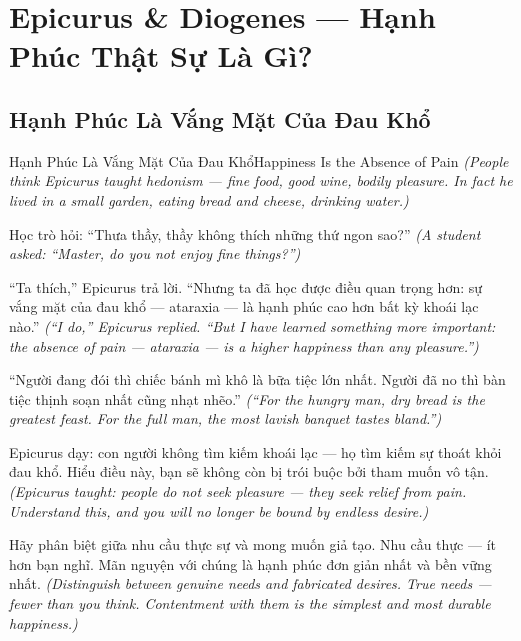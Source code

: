 \chapter{Epicurus \& Diogenes — Hạnh Phúc Thật Sự Là Gì?}

\section{Hạnh Phúc Là Vắng Mặt Của Đau Khổ}
\begin{truyen}{Hạnh Phúc Là Vắng Mặt Của Đau Khổ}{Happiness Is the Absence of Pain}
\textit{(People think Epicurus taught hedonism — fine food, good wine, bodily pleasure. In fact he lived in a small garden, eating bread and cheese, drinking water.)}

Học trò hỏi: ``Thưa thầy, thầy không thích những thứ ngon sao?''
\textit{(A student asked: ``Master, do you not enjoy fine things?'')}

``Ta thích,'' Epicurus trả lời. ``Nhưng ta đã học được điều quan trọng hơn: sự vắng mặt của đau khổ — ataraxia — là hạnh phúc cao hơn bất kỳ khoái lạc nào.''
\textit{(``I do,'' Epicurus replied. ``But I have learned something more important: the absence of pain — ataraxia — is a higher happiness than any pleasure.'')}

``Người đang đói thì chiếc bánh mì khô là bữa tiệc lớn nhất. Người đã no thì bàn tiệc thịnh soạn nhất cũng nhạt nhẽo.''
\textit{(``For the hungry man, dry bread is the greatest feast. For the full man, the most lavish banquet tastes bland.'')}

Epicurus dạy: con người không tìm kiếm khoái lạc — họ tìm kiếm sự thoát khỏi đau khổ. Hiểu điều này, bạn sẽ không còn bị trói buộc bởi tham muốn vô tận.
\textit{(Epicurus taught: people do not seek pleasure — they seek relief from pain. Understand this, and you will no longer be bound by endless desire.)}

\end{truyen}

\begin{baihoc}
Hãy phân biệt giữa nhu cầu thực sự và mong muốn giả tạo. Nhu cầu thực — ít hơn bạn nghĩ. Mãn nguyện với chúng là hạnh phúc đơn giản nhất và bền vững nhất.
\textit{(Distinguish between genuine needs and fabricated desires. True needs — fewer than you think. Contentment with them is the simplest and most durable happiness.)}
\end{baihoc}
\ngancach

